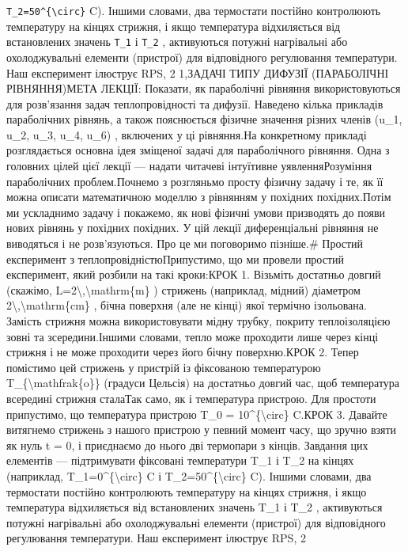 \documentclass[
  ukrainian,
]{article}
\begin{document}
{{\texttt{T\_2=50\^{}\{\textbackslash{}circ\}} C). Іншими словами, два
термостати постійно контролюють температуру на кінцях стрижня, і якщо
температура відхиляється від встановлених значень \texttt{T\_1} і
\texttt{T\_2} , активуються потужні нагрівальні або охолоджувальні
елементи (пристрої) для відповідного регулювання температури. Наш
експеримент ілюструє RPS, 2
1,}{ЗАДАЧІ ТИПУ ДИФУЗІЇ (ПАРАБОЛІЧНІ РІВНЯННЯ)МЕТА ЛЕКЦІЇ: Показати, як параболічні рівняння використовуються для розв'язання задач теплопровідності та дифузії. Наведено кілька прикладів параболічних рівнянь, а також пояснюється фізичне значення різних членів (u\_1, u\_2, u\_3, u\_4, u\_6) , включених у ці рівняння.На конкретному прикладі розглядається основна ідея зміщеної задачі для параболічного рівняння. Одна з головних цілей цієї лекції --- надати читачеві інтуїтивне уявленняРозуміння параболічних проблем.Почнемо з розгляньмо просту фізичну задачу і те, як її можна описати математичною моделлю з рівнянням у похідних похідних.Потім ми ускладнимо задачу і покажемо, як нові фізичні умови призводять до появи нових рівнянь у похідних похідних. У цій лекції диференціальні рівняння не виводяться і не розв'язуються. Про це ми поговоримо пізніше.\# Простий експеримент з теплопровідністюПрипустимо, що ми провели простий експеримент, який розбили на такі кроки:КРОК 1. Візьміть достатньо довгий (скажімо, L=2\textbackslash,\textbackslash mathrm\{m\} ) стрижень (наприклад, мідний) діаметром 2\textbackslash,\textbackslash mathrm\{cm\} , бічна поверхня (але не кінці) якої термічно ізольована. Замість стрижня можна використовувати мідну трубку, покриту теплоізоляцією зовні та зсередини.Іншими словами, тепло може проходити лише через кінці стрижня і не може проходити через його бічну поверхню.КРОК 2. Тепер помістимо цей стрижень у пристрій із фіксованою температурою T\_\{\textbackslash mathfrak\{o\}\} (градуси Цельсія) на достатньо довгий час, щоб температура всередині стрижня сталаТак само, як і температура пристрою. Для простоти припустимо, що температура пристрою T\_0 = 10\^{}\{\textbackslash circ\} C.КРОК 3. Давайте витягнемо стрижень з нашого пристрою у певний момент часу, що зручно взяти як нуль t = 0, і приєднаємо до нього дві термопари з кінців. Завдання цих елементів --- підтримувати фіксовані температури T\_1 і T\_2 на кінцях (наприклад, T\_1=0\^{}\{\textbackslash circ\} C і T\_2=50\^{}\{\textbackslash circ\} C). Іншими словами, два термостати постійно контролюють температуру на кінцях стрижня, і якщо температура відхиляється від встановлених значень T\_1 і T\_2 , активуються потужні нагрівальні або охолоджувальні елементи (пристрої) для відповідного регулювання температури. Наш експеримент ілюструє RPS, 2 }}
\end{document}
